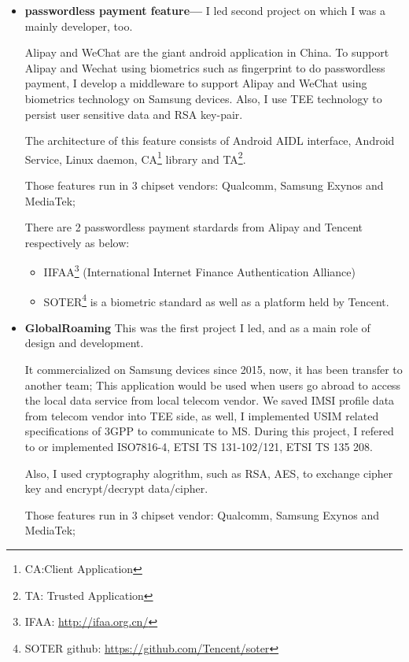 \documentclass{article}
\begin{document}
\begin{itemize}
\item{\textbf{passwordless payment feature---}}
I led second project on which I was a mainly developer, too.

Alipay and WeChat are the giant android application in China.
To support Alipay and Wechat using biometrics such as fingerprint to do passwordless payment,
I develop a middleware to support Alipay and WeChat using biometrics technology on Samsung devices.
Also, I use TEE technology to persist user sensitive data and RSA key-pair.

The architecture of this feature consists of Android AIDL interface, Android Service, Linux daemon, CA\footnote{CA:Client Application} library
and TA\footnote{TA: Trusted Application}.

Those features run in 3 chipset vendors: Qualcomm, Samsung Exynos and MediaTek;

There are 2 passwordless payment stardards from Alipay and Tencent respectively as below:

\begin{itemize}
\item[1]{IIFAA}\footnote{IFAA: \url{http://ifaa.org.cn/}}
(International Internet Finance Authentication Alliance)

\item[2]{SOTER}\footnote{SOTER github: \url{https://github.com/Tencent/soter}}
is a biometric standard as well as a platform held by Tencent.
\end{itemize}

\item{\textbf{GlobalRoaming}}
This was the first project I led, and as a main role of design and development.

It commercialized on Samsung devices since 2015, now, it has been transfer to another team;
This application would be used when users go abroad to access the local data service from local telecom vendor.
We saved IMSI profile data from telecom vendor into TEE side, as well, I implemented USIM related specifications of 3GPP to communicate to MS.
During this project, I refered to or implemented ISO7816-4, ETSI TS 131-102/121, ETSI TS 135 208.

Also, I used cryptography alogrithm, such as RSA, AES, to exchange cipher key and encrypt/decrypt data/cipher.

Those features run in 3 chipset vendor: Qualcomm, Samsung Exynos and MediaTek;

\end{itemize}
\end{document}
